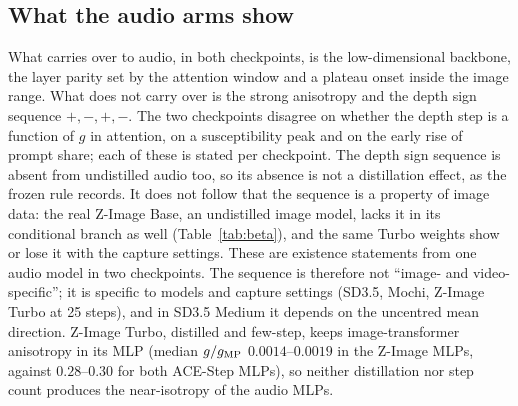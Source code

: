 \documentclass[11pt]{article}
\begin{document}
\subsection{What the audio arms show}
What carries over to audio, in both checkpoints, is the low-dimensional backbone, the layer parity set by the attention window and a plateau onset inside the image range. What does not carry over is the strong anisotropy and the depth sign sequence $+,-,+,-$. The two checkpoints disagree on whether the depth step is a function of $g$ in attention, on a susceptibility peak and on the early rise of prompt share; each of these is stated per checkpoint. The depth sign sequence is absent from undistilled audio too, so its absence is not a distillation effect, as the frozen rule records. It does not follow that the sequence is a property of image data: the real Z-Image Base, an undistilled image model, lacks it in its conditional branch as well (Table~\ref{tab:beta}), and the same Turbo weights show or lose it with the capture settings. These are existence statements from one audio model in two checkpoints. The sequence is therefore not ``image- and video-specific''; it is specific to models and capture settings (SD3.5, Mochi, Z-Image Turbo at 25 steps), and in SD3.5 Medium it depends on the uncentred mean direction. Z-Image Turbo, distilled and few-step, keeps image-transformer anisotropy in its MLP (median $g/g_{\rm MP}$ $0.0014$--$0.0019$ in the Z-Image MLPs, against $0.28$--$0.30$ for both ACE-Step MLPs), so neither distillation nor step count produces the near-isotropy of the audio MLPs.

\FloatBarrier
\end{document}
